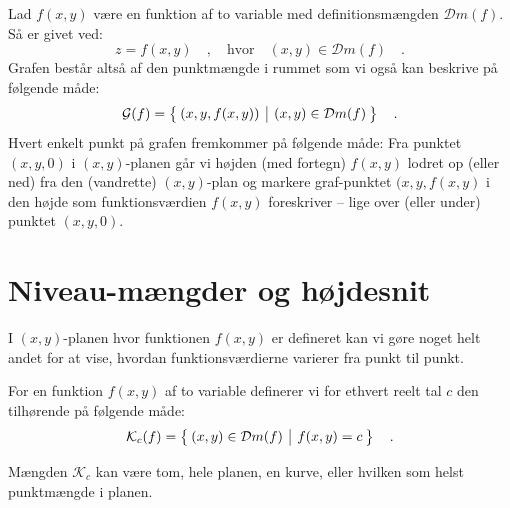 \begin{definition}
Lad $f(x,y)$ være en funktion af to variable med definitionsmængden $\mathcal{D}m(f)$. Så er  givet ved:
\begin{equation}
z = f(x,y) \quad , \quad \textrm{hvor} \quad (x,y) \in \mathcal{D}m(f) \quad .
\end{equation}
Grafen består altså af den punktmængde i rummet som vi også kan beskrive på følgende måde:
\begin{equation}
\mathcal{G}(f) = \left\lbrace \hspace*{-1mm} \begin{array}{c|c} (x,y,f(x,y)) & (x,y) \in \mathcal{D}m(f) \end{array} \hspace*{-1mm} \right\rbrace \quad .
\end{equation}
Hvert enkelt punkt på grafen fremkommer på følgende måde:  Fra punktet $(x,y,0)$ i $(x, y)$-planen
går vi højden (med fortegn) $f(x,y)$ lodret op (eller ned) fra den (vandrette) $(x, y)$-plan og markere graf-punktet $(x, y, f(x,y)$ i den højde som funktionsværdien $f(x,y)$ foreskriver -- lige over (eller under) punktet $(x,y,0)$.
\end{definition}



\section{Niveau-mængder og højdesnit}
I $(x,y)$-planen hvor funktionen $f(x,y)$ er defineret kan vi gøre noget helt andet for at vise, hvordan funktionsværdierne varierer fra punkt til punkt.

\begin{definition}
For en funktion $f(x,y)$ af to variable definerer vi for ethvert reelt tal $c$ den tilhørende  på følgende måde:
\begin{equation}
\mathcal{K}_{c}(f) = \left\lbrace \hspace*{-1mm} \begin{array}{c|c} (x,y) \in \mathcal{D}m(f) & f(x,y) = c \end{array} \hspace*{-1mm} \right\rbrace \quad .
\end{equation}
\end{definition}


Mængden $\mathcal{K}_{c}$ kan være tom, hele planen, en kurve,  eller hvilken som helst punktmængde i planen.



